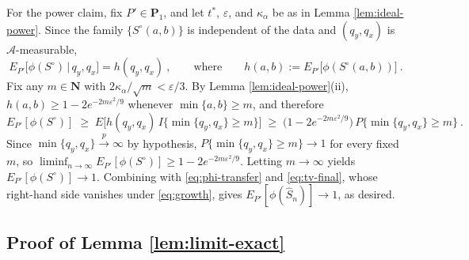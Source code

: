 \documentclass[11pt]{article}
\numberwithin{equation}{section}
\begin{document}
For the power claim, fix $P'\in\mathbf P_1$, and let $t^*$, $\varepsilon$, and $\kappa_\alpha$ be as in Lemma \ref{lem:ideal-power}. Since the family $\{S^{\circ}(a,b)\}$ is independent of the data and $(q_y,q_x)$ is $\mathcal A$-measurable,
\begin{equation*}
 E_{P'}\big[\phi(S^{\circ})\,\big|\,q_y,q_x\big]=h(q_y,q_x)~,
 \qquad\text{where}\qquad
 h(a,b):=E_{P'}\big[\phi(S^{\circ}(a,b))\big]~.
\end{equation*}
Fix any $m\in\mathbf N$ with $2\kappa_\alpha/\sqrt{m}<\varepsilon/3$. By Lemma \ref{lem:ideal-power}(ii), $h(a,b)\ge 1-2e^{-2m\varepsilon^2/9}$ whenever $\min\{a,b\}\ge m$, and therefore
\begin{equation*}
 E_{P'}[\phi(S^{\circ})]
 \;\ge\; E\big[h(q_y,q_x)\,I\{\min\{q_y,q_x\}\ge m\}\big]
 \;\ge\;\big(1-2e^{-2m\varepsilon^2/9}\big)\,P\{\min\{q_y,q_x\}\ge m\}~.
\end{equation*}
Since $\min\{q_y,q_x\}\overset{p}{\to}\infty$ by hypothesis, $P\{\min\{q_y,q_x\}\ge m\}\to1$ for every fixed $m$, so $\liminf_{n\to\infty}E_{P'}[\phi(S^{\circ})]\ge 1-2e^{-2m\varepsilon^2/9}$. Letting $m\to\infty$ yields $E_{P'}[\phi(S^{\circ})]\to1$. Combining with \eqref{eq:phi-transfer} and \eqref{eq:tv-final}, whose right-hand side vanishes under \eqref{eq:growth}, gives $E_{P'}[\phi(\hat S_n)]\to1$, as desired.


\subsection{Proof of Lemma \ref{lem:limit-exact}}
\end{document}
